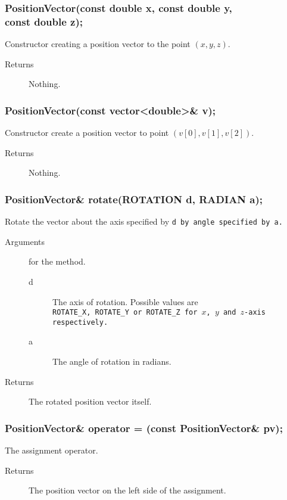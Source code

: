 \subsubsection{PositionVector(const double x, const double y,\\ 
const double z);}
Constructor creating a position vector to the point $(x,y,z)$. 
    \begin{description}
       \item [Returns] Nothing.
    \end{description} 

\subsubsection{PositionVector(const vector<double>\& v);} 
Constructor create a position vector to point $(v[0],v[1],v [2])$. 
    \begin{description}
       \item [Returns] Nothing.
    \end{description} 

\subsubsection{PositionVector\& rotate(ROTATION d, RADIAN a);} 
Rotate the vector about the  axis specified by \tt d \rm by angle
specified by \tt a\rm.
 \begin{description}  
    \item [Arguments] for the method.
      \begin{description}
        \item [d] The axis of rotation. Possible values are \\
                  \tt ROTATE\_X\rm, \tt ROTATE\_Y \rm
                  or \tt ROTATE\_Z \rm for $x$, $y$ and 
                  $z$-axis respectively. 
        \item [a] The angle of rotation in radians.
      \end{description}
    \item [Returns] The rotated position vector itself.
 \end{description}

\subsubsection{PositionVector\& operator = (const PositionVector\& pv);}
The assignment operator. 
    \begin{description}
       \item [Returns] The position vector on the left side of the assignment.
    \end{description}

